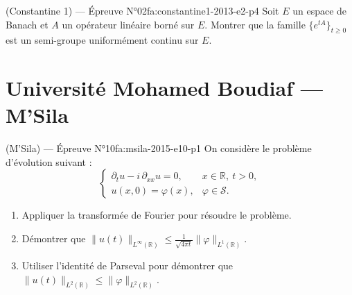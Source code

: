 \newpage
\begin{problem}{(Constantine 1) — Épreuve N°02}{fa:constantine1-2013-e2-p4}
Soit $E$ un espace de Banach et $A$ un opérateur linéaire borné sur $E$. Montrer que la famille $\{e^{tA}\}_{t\ge0}$ est un semi-groupe uniformément continu sur $E$.
\end{problem}
\newpage

\section{Université Mohamed Boudiaf --- M'Sila}
\begin{problem}{(M'Sila) — Épreuve N°10}{fa:msila-2015-e10-p1}
On considère le problème d'évolution suivant :
$$\begin{cases}\partial_tu-i\,\partial_{xx}u=0, & x\in\mathbb{R},\ t>0,\\ u(x,0)=\varphi(x), & \varphi\in\mathcal{S}.\end{cases}$$
\begin{enumerate}\item Appliquer la transformée de Fourier pour résoudre le problème.\item Démontrer que $\lVert u(t)\rVert_{L^\infty(\mathbb{R})}\leq\frac{1}{\sqrt{4\pi t}}\lVert\varphi\rVert_{L^1(\mathbb{R})}$.\item Utiliser l'identité de Parseval pour démontrer que $\lVert u(t)\rVert_{L^2(\mathbb{R})}\leq\lVert\varphi\rVert_{L^2(\mathbb{R})}$.\end{enumerate}
\end{problem}
